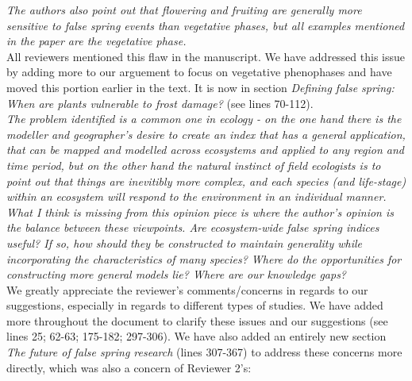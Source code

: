 \documentclass[11pt,a4paper]{article}
\begin{document}
\textit{The authors also point out that flowering and fruiting are generally more sensitive to false spring events than vegetative phases, but all examples mentioned in the paper are the vegetative phase.} \\

All reviewers mentioned this flaw in the manuscript. We have addressed this issue by adding more to our arguement to focus on vegetative phenophases and have moved this portion earlier in the text. It is now in section \textit{Defining false spring: When are plants vulnerable to frost damage?} (see lines 70-112). \\

\textit{The problem identified is a common one in ecology - on the one hand there is the modeller and geographer's desire to create an index that has a general application, that can be mapped and modelled across ecosystems and applied to any region and time period, but on the other hand the natural instinct of field ecologists is to point out that things are inevitibly more complex, and each species (and life-stage) within an ecosystem will respond to the environment in an individual manner. What I think is missing from this opinion piece is where the author's opinion is the balance between these viewpoints.  Are ecosystem-wide false spring indices useful?  If so, how should they be constructed to maintain generality while incorporating the characteristics of many species?  Where do the opportunities for constructing more general models lie? Where are our knowledge gaps?} \\

We greatly appreciate the reviewer's comments/concerns in regards to our suggestions, especially in regards to different types of studies. We have added more throughout the document to clarify these issues and our suggestions (see lines 25; 62-63; 175-182; 297-306). We have also added an entirely new section \textit{The future of false spring research} (lines 307-367) to address these concerns more directly, which was also a concern of Reviewer 2's: \\ %
\end{document}
